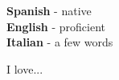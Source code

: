 \documentclass[9pt]{developercv} %
\begin{document}

\begin{minipage}[t]{0.3\textwidth}
    \vspace{-\baselineskip} %


    \textbf{Spanish} - native\\
    \textbf{English} - proficient\\
    \textbf{Italian} - a few words
\end{minipage}
\hfill
\begin{minipage}[t]{0.7\textwidth}
    \vspace{-\baselineskip} %


    I love... \lorem
\end{minipage}

\end{document}
